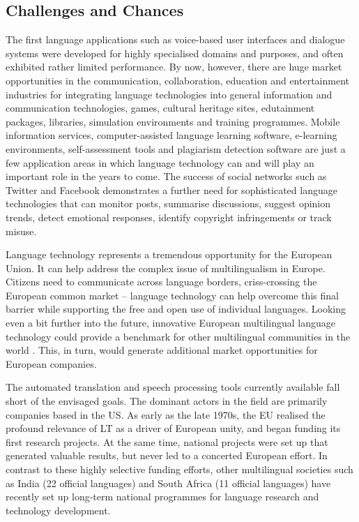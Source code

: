 \documentclass[10pt, plain]{../../metanetpaper}
\begin{document}
\begin{multicols}{2}
\subsection{Challenges and Chances}
\label{sec:challenges-chances}

The first language applications such as voice-based user interfaces and dialogue systems were developed for highly specialised domains and purposes, and often exhibited rather limited performance. By now, however, there are huge market opportunities in the communication, collaboration, education and entertainment industries for integrating language technologies into general information and communication technologies, games, cultural heritage sites, edutainment packages, libraries, simulation environments and training programmes. Mobile information services, computer-assisted language learning software, e-learning environments, self-assessment tools and plagiarism detection software are just a few application areas in which language technology can and will play an important role in the years to come. The success of social networks such as Twitter and Facebook demonstrates a further need for sophisticated language technologies that can monitor posts, summarise discussions, suggest opinion trends, detect emotional responses, identify copyright infringements or track misuse.

Language technology represents a tremendous opportunity for the European Union. It can help address the complex issue of multilingualism in Europe. Citizens need to communicate across language borders, criss-crossing the European common market -- language technology can help overcome this final barrier while supporting the free and open use of individual languages. Looking even a bit further into the future, innovative European multilingual language technology could provide a benchmark for other multilingual communities in the world \cite{maaya2012,ifa2008,ifa2011}. This, in turn, would generate additional market opportunities for European companies.

The automated translation and speech processing tools currently available fall short of the envisaged goals. The dominant actors in the field are primarily companies based in the US. As early as the late 1970s, the EU realised the profound relevance of LT as a driver of European unity, and began funding its first research projects. At the same time, national projects were set up that generated valuable results, but never led to a concerted European effort. In contrast to these highly selective funding efforts, other multilingual societies such as India (22 official languages) and South Africa (11 official languages) have recently set up long-term national programmes for language research and technology development.


\end{multicols}
\end{document}
